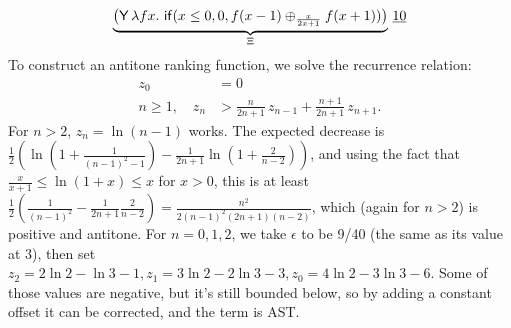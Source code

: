 \begin{example} 
\label{ex:Fair-in-the-limit random walk}
\citep[\S 5.3]{DBLP:journals/pacmpl/McIverMKK18}
\[
\underbrace{\big
(\tY \, \lambda f x .\ 
\tif{x \leq 0}{0}{f(x - 1) \oplus_{\frac{x}{2x+1}} f(x + 1)} \big)}_{\Xi} 
\, \underline{10}
\]
To construct an antitone ranking function, we solve the recurrence relation:
\begin{align*}
z_0 &= 0\\
n \geq 1, \quad z_n &> \textstyle \frac{n}{2n + 1} \, z_{n-1} + \frac{n+1}{2n + 1} \, z_{n+1}.
\end{align*}
For $n > 2$, $z_n = \ln(n-1)$ works. The expected decrease is $\frac 1 2(\ln(1+\frac 1 {(n-1)^2-1}) - \frac 1 {2n+1} \ln(1 + \frac 2 {n-2}))$, and using the fact that $\frac x {x+1} \leq \ln (1+x) \leq x$ for $x > 0$, this is at least $\frac 1 2(\frac 1 {(n-1)^2} - \frac 1 {2n + 1} \frac 2 {n-2}) = \frac {n^2}{2(n-1)^2(2n+1)(n-2)}$, which (again for $n > 2$) is positive and antitone. For $n = 0, 1, 2$, we take $\epsilon$ to be 9/40 (the same as its value at 3), then set $z_2 = 2 \ln 2 - \ln 3 - 1, z_1 = 3 \ln 2 - 2 \ln 3 - 3, z_0 = 4 \ln 2 - 3 \ln 3 - 6$. Some of those values are negative, but it's still bounded below, so by adding a constant offset it can be corrected, and the term is AST.
\end{example}


